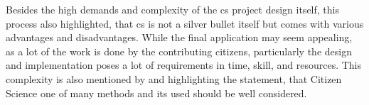 

Besides the high demands and complexity of the \acrshort{cs} project design itself, this process also highlighted, that \acrshort{cs} is not a silver bullet itself but comes with various advantages and disadvantages. While the final application may seem appealing, as a lot of the work is done by the contributing citizens, particularly the design and implementation poses a lot of requirements in time, skill, and resources. This complexity is also mentioned by \autocite{fraislCitizenScienceEnvironmental2022} and \autocite{minkmanCitizenScienceWater2015} highlighting the statement, that Citizen Science one of many methods and its used should be well considered.



